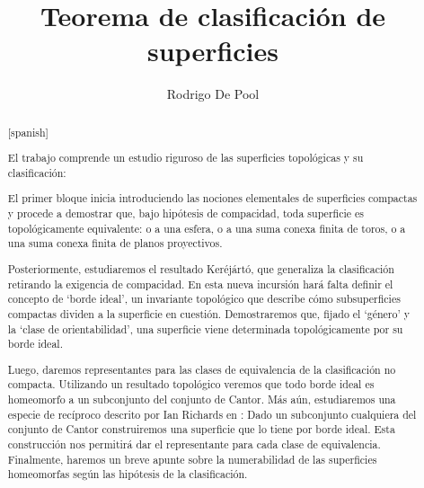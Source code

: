 \documentclass[a4paper,11pt,spanish, twoside, leqno]{tfg-uam}
\title{Teorema de clasificación de superficies}
\author{Rodrigo De Pool}
\theoremstyle{definition}
\begin{document}
\begin{abstract}[spanish]

El trabajo comprende un estudio riguroso de las superficies topológicas y su clasificación:

El primer bloque inicia introduciendo las nociones elementales de superficies compactas y procede a demostrar que, bajo hipótesis de compacidad, toda superficie es topológicamente equivalente: o a una esfera, o a una suma conexa finita de toros, o a una suma conexa finita de planos proyectivos. 

Posteriormente, estudiaremos el resultado Keréjártó, que generaliza la clasificación retirando la exigencia de compacidad. En esta nueva incursión hará falta definir el concepto de `borde ideal', un invariante topológico que describe cómo subsuperficies compactas dividen a la superficie en cuestión. Demostraremos que, fijado el `género' y la `clase de orientabilidad', una superficie viene determinada topológicamente por su borde ideal. 

Luego, daremos representantes para las clases de equivalencia de la clasificación no compacta. Utilizando un resultado topológico veremos que todo borde ideal es homeomorfo a un subconjunto del conjunto de Cantor. Más aún, estudiaremos una especie de recíproco descrito por Ian Richards en \cite{ian}: Dado un subconjunto cualquiera del conjunto de Cantor construiremos una superficie que lo tiene por borde ideal. Esta construcción nos permitirá dar el representante para cada clase de equivalencia. Finalmente, haremos un breve apunte sobre la numerabilidad de las superficies homeomorfas según las hipótesis de la clasificación.
\end{abstract}
\end{document}
